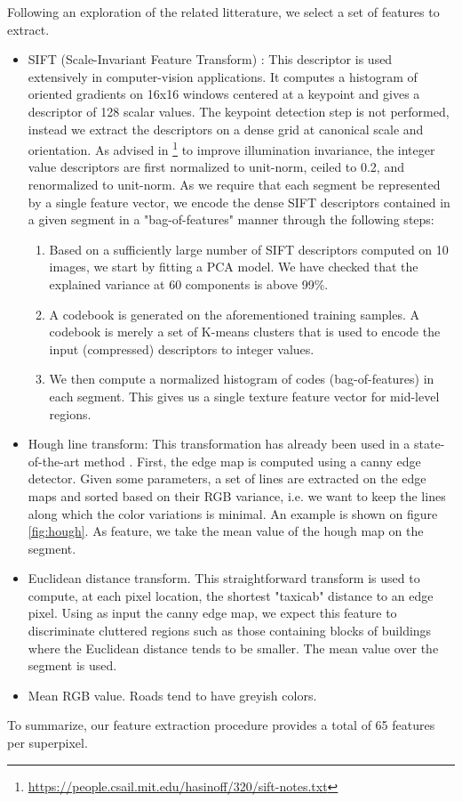 \documentclass[10pt,conference,compsocconf]{IEEEtran}
\begin{document}
Following an exploration of the related litterature, we select a set of features to extract.
\begin{itemize}
\item SIFT (Scale-Invariant Feature Transform) \cite{lowe04}: This descriptor is used extensively in computer-vision applications. It computes a histogram of oriented gradients on 16x16 windows centered at a keypoint and gives a descriptor of 128 scalar values. The keypoint detection step is not performed, instead we extract the descriptors on a dense grid at canonical scale and orientation. As advised in \footnote{\url{https://people.csail.mit.edu/hasinoff/320/sift-notes.txt}}
 to improve illumination invariance, the integer value descriptors are first normalized to unit-norm, ceiled to 0.2, and renormalized to unit-norm. As we require that each segment be represented by a single feature vector, we encode the dense SIFT descriptors contained in a given segment in a "bag-of-features" manner through the following steps: 
\begin{enumerate}
\item Based on a sufficiently large number of SIFT descriptors computed on 10 images, we start by fitting a PCA model. We have checked that the explained variance at 60 components is above 99\%.
\item A codebook is generated on the aforementioned training samples. A codebook is merely a set of K-means clusters that is used to encode the input (compressed) descriptors to integer values.
\item We then compute a normalized histogram of codes (bag-of-features) in each segment. This gives us a single texture feature vector for mid-level regions.
\end{enumerate}
\item Hough line transform: This transformation has already been used in a state-of-the-art method \cite{2016ISPAr41B3..891L}. First, the edge map is computed using a canny edge detector. Given some parameters, a set of lines are extracted on the edge maps and sorted based on their RGB variance, i.e. we want to keep the lines along which the color variations is minimal. An example is shown on figure \ref{fig:hough}. As feature, we take the mean value of the hough map on the segment.
\item Euclidean distance transform. This straightforward transform is used to compute, at each pixel location, the shortest "taxicab" distance to an edge pixel. Using as input the canny edge map, we expect this feature to discriminate cluttered regions such as those containing blocks of buildings where the Euclidean distance tends to be smaller. The mean value over the segment is used.
\item Mean RGB value. Roads tend to have greyish colors.
\end{itemize}
To summarize, our feature extraction procedure provides a total of 65 features
per superpixel.
\end{document}
